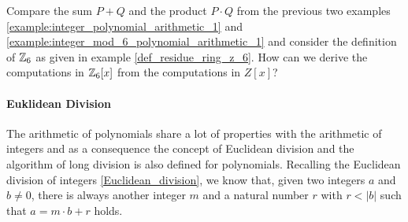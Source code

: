 \begin{exercise}
Compare the sum $P+Q$ and the product $P\cdot Q$ from the previous two examples \ref{example:integer_polynomial_arithmetic_1} and \ref{example:integer_mod_6_polynomial_arithmetic_1} and consider the definition of $\mathbb{Z}_6$ as given in example \ref{def_residue_ring_z_6}. How can we derive the computations in $\mathbb{Z}_6[x]$ from the computations in $Z[x]$?
\end{exercise}
\paragraph{Euklidean Division}
The arithmetic of polynomials share a lot of properties with the arithmetic of integers and as a consequence the concept of Euclidean division and the algorithm of long division is also defined for polynomials. Recalling the Euclidean division of integers \ref{Euclidean_division}, we know that, given two integers $a$ and $b\neq 0$, there is always another integer $m$ and a natural number $r$ with $r<|b|$ such that $a = m\cdot b +r$ holds.

